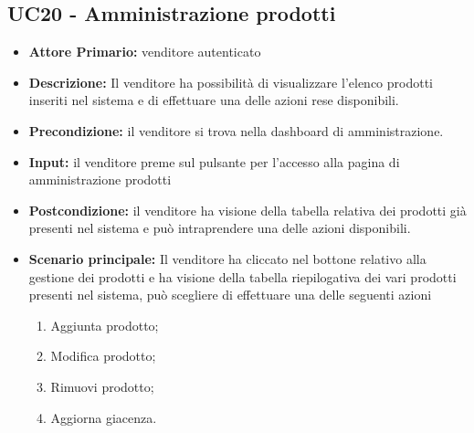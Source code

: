 \subsection{UC20 - Amministrazione prodotti}
\label{UC20}
\begin{itemize}
    \item \textbf{Attore Primario:}  venditore autenticato
    \item \textbf{Descrizione:} Il venditore ha possibilità di visualizzare l’elenco prodotti inseriti nel sistema e di effettuare una delle azioni rese disponibili.
    \item \textbf{Precondizione:} il venditore si trova nella dashboard di amministrazione.
    \item \textbf{Input:} il venditore preme sul pulsante per l'accesso alla pagina di amministrazione prodotti
    \item \textbf{Postcondizione:} il venditore ha visione della tabella relativa dei prodotti già presenti nel sistema e può intraprendere una delle azioni disponibili.
    \item \textbf{Scenario principale:} Il venditore ha cliccato nel bottone relativo alla gestione dei prodotti e ha visione della tabella riepilogativa dei vari prodotti presenti nel sistema, può scegliere di effettuare una delle seguenti azioni 
    \begin{enumerate}
        \item Aggiunta prodotto;
        \item Modifica prodotto;
        \item Rimuovi prodotto;
        \item Aggiorna giacenza.
    \end{enumerate}
\end{itemize}


